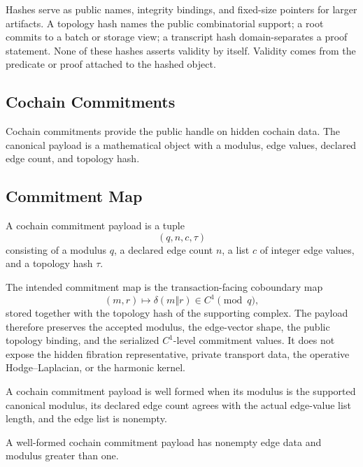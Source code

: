 Hashes serve as public names, integrity bindings, and fixed-size pointers for
larger artifacts. A topology hash names the public combinatorial support; a
root commits to a batch or storage view; a transcript hash domain-separates a
proof statement. None of these hashes asserts validity by itself. Validity
comes from the predicate or proof attached to the hashed object.

\subsection{Cochain Commitments}

Cochain commitments provide the public handle on hidden cochain data. The
canonical payload is a mathematical object with a modulus, edge values, declared
edge count, and topology hash.

\subsection{Commitment Map}

\begin{definition}\label{def:cochain-commitment-payload}
  A cochain commitment payload is a tuple
  \[
    (q,n,c,\tau)
  \]
  consisting of a modulus \(q\), a declared edge count \(n\), a list \(c\) of
  integer edge values, and a topology hash \(\tau\).
\end{definition}

The intended commitment map is the transaction-facing coboundary map
\[
  (m,r) \longmapsto \delta(m\Vert r) \in C^1 \pmod q,
\]
stored together with the topology hash of the supporting complex. The payload
therefore preserves the accepted modulus, the edge-vector shape, the public
topology binding, and the serialized \(C^1\)-level commitment values. It does
not expose the hidden fibration representative, private transport data, the
operative Hodge--Laplacian, or the harmonic kernel.

\begin{definition}\label{def:commitment-well-formedness}
  A cochain commitment payload is well formed when its modulus is the supported
  canonical modulus, its declared edge count agrees with the actual edge-value
  list length, and the edge list is nonempty.
\end{definition}

\begin{proposition}\label{prop:well-formed-committed-payloads}
  A well-formed cochain commitment payload has nonempty edge data and modulus
  greater than one.
\end{proposition}

